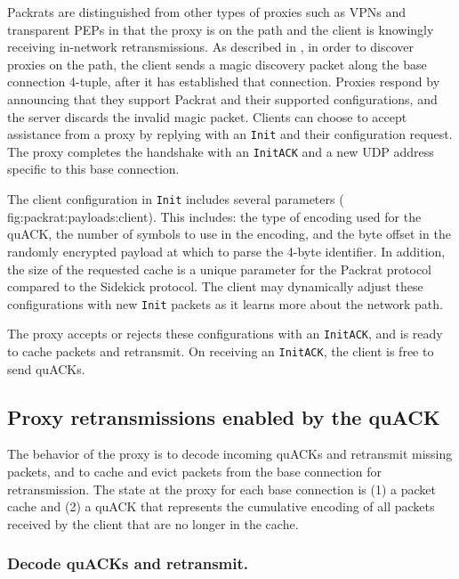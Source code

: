 

Packrats are distinguished from other types of proxies such as VPNs and
transparent PEPs in that the proxy is on the path and the client is knowingly
receiving in-network retransmissions.
As described in , in order to discover
proxies on the path, the client sends a magic discovery packet along the base
connection 4-tuple, after it has established that connection. Proxies respond by
announcing that they support Packrat and their supported configurations, and the
server discards the invalid magic packet. Clients can choose to accept
assistance from a proxy by replying with an \texttt{Init} and their
configuration request. The proxy completes the handshake with an \texttt
{InitACK} and a new UDP address specific to this base connection.

The client configuration in \texttt{Init} includes several parameters (\Cref
{fig:packrat:payloads:client}). This includes: the type of encoding used for the quACK,
the number of symbols to use in the encoding, and the byte offset in the randomly
encrypted payload at which to parse the 4-byte identifier. In addition, the size
of the requested cache is a unique parameter for the Packrat protocol compared
to the Sidekick protocol. The client may dynamically adjust these configurations
with new \texttt{Init} packets as it learns more about the network path.

The proxy accepts or rejects these configurations with an \texttt{InitACK},
and is ready to cache packets and retransmit. On receiving an \texttt{InitACK},
the client is free to send quACKs.

\subsection{Proxy retransmissions enabled by the quACK}
\label{sec:packrat:design:proxy}

The behavior of the proxy is to decode incoming quACKs and retransmit missing
packets, and to cache and evict packets from the base connection for
retransmission. The state at the proxy for each base connection is (1) a packet
cache and (2) a quACK that represents the cumulative encoding of all packets
received by the client that are no longer in the cache.

\subsubsection{Decode quACKs and retransmit.}

